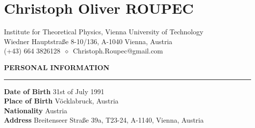 \documentclass[a4paper,12pt,twoside,openright]{report}
\newenvironment{rSection}[1]{ %
  \sectionskip
  \MakeUppercase{\bf #1} %
  \sectionlineskip
  \hrule %
  \begin{list}{}{ %
    \setlength{\leftmargin}{1.5em} %
  }
  \item[]
}{
  \end{list}
}
\def\sectionlineskip{\medskip} %
\def\sectionskip{\medskip} %
\begin{document}
\newpage
\makeatletter
\renewenvironment{thebibliography}[1]
     {\chapter*{\bibname}%
      \@mkboth{\MakeUppercase\bibname}{\MakeUppercase\bibname}%
      \list{\@biblabel{\@arabic\c@enumiv}}%
           {\settowidth\labelwidth{\@biblabel{#1}}%
            \leftmargin\labelwidth
            \advance\leftmargin\labelsep
            \@openbib@code
            \usecounter{enumiv}%
            \let\p@enumiv\@empty
            \renewcommand\theenumiv{\@arabic\c@enumiv}}%
      \sloppy
      \clubpenalty4000
      \@clubpenalty \clubpenalty
      \widowpenalty4000%
      \sfcode`\.\@m}
     {\def\@noitemerr
       {\@latex@warning{Empty `thebibliography' environment}}%
      \endlist}
\makeatother
\clearpage%

\singlespace

%
\newpage
{\centering
\section*{Christoph Oliver ROUPEC}
Institute for Theoretical Physics, Vienna University of Technology\\
Wiedner Hauptstraße 8-10/136, A-1040 Vienna, Austria\\
(+43) 664 3826128 $\,\diamond\,$ Christoph.Roupec@gmail.com\vspace{7pt}\\

}

\begin{rSection}{Personal Information}
     \vspace{7pt}
      {\bf Date of Birth} \hfill { 31st of July 1991}\vspace{7pt}
      \\{\bf Place of Birth} \hfill { Vöcklabruck, Austria}\vspace{7pt}
      \\{\bf Nationality} \hfill { Austria}\vspace{7pt}
      \\{\bf Address} \hfill {Breitenseer Straße 39a, T23-24, A-1140, Vienna, Austria}

\end{rSection}
\end{document}

